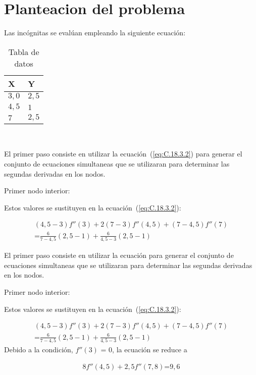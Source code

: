 \documentclass[conference]{IEEEtran}
\begin{document}
\section{Planteacion del problema}

Las incógnitas se evalúan empleando la siguiente ecuación:


\begin{table}[h]
	\begin{tabularx}{\linewidth}{|>{\centering\arraybackslash}X|>{\centering\arraybackslash}X|}
		\hline
		\textbf{X} & \textbf{Y} \\ \hline
        $3,0$      & $2,5$      \\ \hline
        $4,5$      & $1$     \\ \hline
        $7$      & $2,5$     \\ \hline
	\end{tabularx}
	\label{tab:ejemplo_trazadores_cubicos}~\caption{Tabla de datos}
\end{table}


El primer paso consiste en utilizar la ecuación~(\ref{eq:C.18.3.2})
para generar el conjunto de ecuaciones simultaneas que se
utilizaran para determinar las segundas derivadas en los nodos.

Primer nodo interior:

Estos valores se sustituyen en la ecuación~(\ref{eq:C.18.3.2}):

\begin{multline*}
	(4,5 - 3)f''(3) + 2(7 - 3)f''(4,5) + (7 - 4,5)f''(7) \\
	\text{=} \frac{6}{7 - 4,5}(2,5 - 1) + \frac{6}{4,5 - 3}(2,5 - 1)
\end{multline*}


El primer paso consiste en utilizar la ecuación para generar el conjunto de ecuaciones simultaneas que se
utilizaran para determinar las segundas derivadas en los nodos.

Primer nodo interior:

Estos valores se sustituyen en la ecuación~(\ref{eq:C.18.3.2}):

\begin{multline*}
	(4,5 - 3)f''(3) + 2(7 - 3)f''(4,5) + (7 - 4,5)f''(7) \\
	\text{=} \frac{6}{7 - 4,5}(2,5 - 1) + \frac{6}{4,5 - 3}(2,5 - 1)
\end{multline*}
Debido a la condición, $f''(3)$ = $0$, la ecuación se reduce a

\begin{align*}
	8f''(4,5) + 2,5f''(7,8) \text{=}  9,6
\end{align*}
\end{document}
